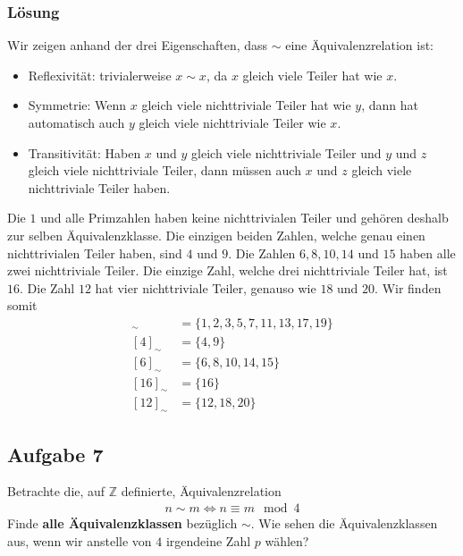 \documentclass[a4paper,10pt]{article}
\newcommand{\Z}{\mathbb{Z}}
\newcommand{\s}[1]{#1}
\begin{document}
\s{\subsubsection*{Lösung}
Wir zeigen anhand der drei Eigenschaften, dass $\sim$ eine Äquivalenzrelation ist:
\begin{itemize}
    \item Reflexivität: trivialerweise $x\sim x$, da $x$ gleich viele Teiler hat wie $x$.
    \item Symmetrie: Wenn $x$ gleich viele nichttriviale Teiler hat wie $y$, dann hat automatisch auch $y$ gleich viele nichttriviale Teiler wie $x$.
    \item Transitivität: Haben $x$ und $y$ gleich viele nichttriviale Teiler und $y$ und $z$ gleich viele nichttriviale Teiler, dann müssen auch $x$ und $z$ gleich viele nichttriviale Teiler haben.
\end{itemize}
Die $1$ und alle Primzahlen haben keine nichttrivialen Teiler und gehören deshalb zur selben Äquivalenzklasse. Die einzigen beiden Zahlen, welche genau einen nichttrivialen Teiler haben, sind $4$ und $9$. Die Zahlen $6,8,10,14$ und $15$ haben alle zwei nichttriviale Teiler. Die einzige Zahl, welche drei nichttriviale Teiler hat, ist $16$. Die Zahl $12$ hat vier nichttriviale Teiler, genauso wie $18$ und $20$. Wir finden somit
\begin{align*}
    [1]_\sim &= \{1,2,3,5,7,11,13,17,19\}\\
    [4]_\sim &= \{4,9\}\\
    [6]_\sim &= \{6,8,10,14,15\}\\
    [16]_\sim &= \{16\}\\
    [12]_\sim &= \{12,18,20\}
\end{align*}
}

\subsection*{Aufgabe 7}
Betrachte die, auf $\Z$ definierte, Äquivalenzrelation
\begin{align*}
    n\sim m \iff n \equiv m\mod 4
\end{align*}
Finde \textbf{alle Äquivalenzklassen} bezüglich $\sim$. Wie sehen die Äquivalenzklassen aus, wenn wir anstelle von $4$ irgendeine Zahl $p$ wählen?
\end{document}
